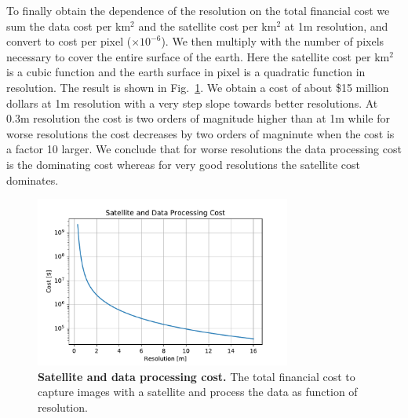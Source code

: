 To finally obtain the dependence of the resolution on the total financial cost we sum the data cost per km$^2$ and the satellite cost per km$^2$ at 1m resolution, and convert to cost per pixel ($\times 10^{-6}$). We then multiply with the number of pixels necessary to cover the entire surface of the earth. Here the satellite cost per km$^2$ is a cubic function and the earth surface in pixel is a quadratic function in resolution. The result is shown in Fig.~\ref{fig:costs}. We obtain a cost of about \$15 million dollars at 1m resolution with a very step slope towards better resolutions. At 0.3m resolution the cost is two orders of magnitude higher than at 1m while for worse resolutions the cost decreases by two orders of magninute when the cost is a factor 10 larger. We conclude that for worse resolutions the data processing cost is the dominating cost whereas for very good resolutions the satellite cost dominates.

\begin{figure}[h!]
	\centering
	\includegraphics[width=0.75\textwidth]{Figures/costs.pdf}
	\captionsetup{width=1\linewidth}
	\caption{\textbf{Satellite and data processing cost.} The total financial cost to capture images with a satellite and process the data as function of resolution.}
	\label{fig:costs}
\end{figure}


